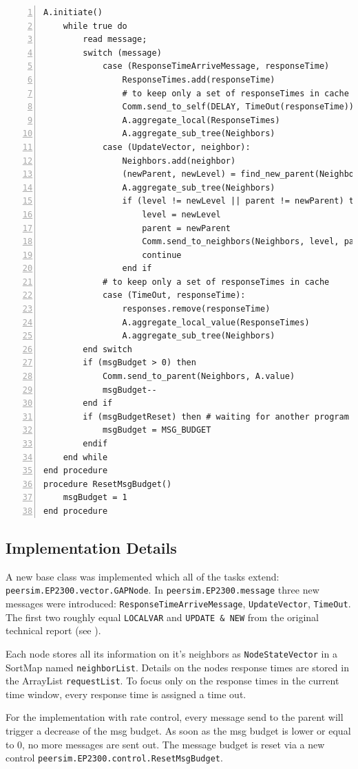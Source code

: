 \documentclass[a4paper, smallheadings,english]{scrartcl}
\begin{document}
\begin{lstlisting}[caption={Pseudocode for $\widetilde{f}(t)$ with rate control}, label={lst:1}, numbers=left, frame=single]
    A.initiate()
    while true do
        read message;
        switch (message)
            case (ResponseTimeArriveMessage, responseTime)
                ResponseTimes.add(responseTime)
                # to keep only a set of responseTimes in cache
                Comm.send_to_self(DELAY, TimeOut(responseTime))
                A.aggregate_local(ResponseTimes)
                A.aggregate_sub_tree(Neighbors)
            case (UpdateVector, neighbor):
                Neighbors.add(neighbor) 
                (newParent, newLevel) = find_new_parent(Neighbors)
                A.aggregate_sub_tree(Neighbors)
                if (level != newLevel || parent != newParent) then
                    level = newLevel
                    parent = newParent
                    Comm.send_to_neighbors(Neighbors, level, parent, A.value())
                    continue
                end if
            # to keep only a set of responseTimes in cache
            case (TimeOut, responseTime):
                responses.remove(responseTime)
                A.aggregate_local_value(ResponseTimes)
                A.aggregate_sub_tree(Neighbors)
        end switch
        if (msgBudget > 0) then
            Comm.send_to_parent(Neighbors, A.value)
            msgBudget--
        end if
        if (msgBudgetReset) then # waiting for another program to change
            msgBudget = MSG_BUDGET
        endif
    end while
end procedure
procedure ResetMsgBudget()
    msgBudget = 1
end procedure
\end{lstlisting}
\subsection{Implementation Details}
A new base class was implemented which all of the tasks extend: \texttt{peersim.EP2300.vector.GAPNode}. In \texttt{peersim.EP2300.message} three new messages were introduced: \texttt{ResponseTimeArriveMessage}, \texttt{UpdateVector}, \texttt{TimeOut}. The first two roughly equal \texttt{LOCALVAR} and \texttt{UPDATE \& NEW} from the original technical report (see \cite{stadler2012protocols}).

Each node stores all its information on it's neighbors as \texttt{NodeStateVector} in a SortMap named \texttt{neighborList}. Details on the nodes response times are stored in the ArrayList \texttt{requestList}. To focus only on the response times in the current time window, every response time is assigned a time out.

For the implementation with rate control, every message send to the parent will trigger a decrease of the msg budget. As soon as the msg budget is lower or equal to 0, no more messages are sent out. The message budget is reset via a new control \texttt{peersim.EP2300.control.ResetMsgBudget}.
\end{document}
